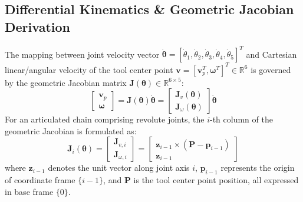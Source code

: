 \documentclass[journal]{IEEEtran}
\begin{document}
\subsection{Differential Kinematics \& Geometric Jacobian Derivation}
The mapping between joint velocity vector $\dot{\boldsymbol{\theta}} = [\dot{\theta}_1, \dot{\theta}_2, \dot{\theta}_3, \dot{\theta}_4, \dot{\theta}_5]^T$ and Cartesian linear/angular velocity of the tool center point $\mathbf{v} = [\mathbf{v}_p^T, \boldsymbol{\omega}^T]^T \in \mathbb{R}^6$ is governed by the geometric Jacobian matrix $\mathbf{J}(\boldsymbol{\theta}) \in \mathbb{R}^{6\times5}$:
\begin{equation}
\begin{bmatrix} \mathbf{v}_p \\ \boldsymbol{\omega} \end{bmatrix} = \mathbf{J}(\boldsymbol{\theta}) \dot{\boldsymbol{\theta}} = \begin{bmatrix} \mathbf{J}_v(\boldsymbol{\theta}) \\ \mathbf{J}_\omega(\boldsymbol{\theta}) \end{bmatrix} \dot{\boldsymbol{\theta}}
\end{equation}
For an articulated chain comprising revolute joints, the $i$-th column of the geometric Jacobian is formulated as:
\begin{equation}
\mathbf{J}_i(\boldsymbol{\theta}) = \begin{bmatrix} \mathbf{J}_{v, i} \\ \mathbf{J}_{\omega, i} \end{bmatrix} = \begin{bmatrix} \mathbf{z}_{i-1} \times (\mathbf{P} - \mathbf{p}_{i-1}) \\ \mathbf{z}_{i-1} \end{bmatrix}
\end{equation}
where $\mathbf{z}_{i-1}$ denotes the unit vector along joint axis $i$, $\mathbf{p}_{i-1}$ represents the origin of coordinate frame $\{i-1\}$, and $\mathbf{P}$ is the tool center point position, all expressed in base frame $\{0\}$.
\end{document}
